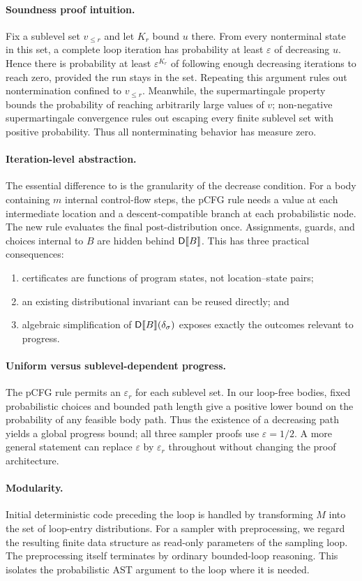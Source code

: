 \paragraph{Soundness proof intuition.}
Fix a sublevel set $v_{\le r}$ and let $K_r$ bound $u$ there. From every nonterminal state in this set, a complete loop iteration has probability at least $\varepsilon$ of decreasing $u$. Hence there is probability at least $\varepsilon^{K_r}$ of following enough decreasing iterations to reach zero, provided the run stays in the set. Repeating this argument rules out nontermination confined to $v_{\le r}$. Meanwhile, the supermartingale property bounds the probability of reaching arbitrarily large values of $v$; non-negative supermartingale convergence rules out escaping every finite sublevel set with positive probability. Thus all nonterminating behavior has measure zero.

\paragraph{Iteration-level abstraction.}
The essential difference to  is the granularity of the decrease condition. For a body containing $m$ internal control-flow steps, the pCFG rule needs a value at each intermediate location and a descent-compatible branch at each probabilistic node. The new rule evaluates the final post-distribution once. Assignments, guards, and choices internal to $B$ are hidden behind $\mathsf{D}\llbracket B\rrbracket$. This has three practical consequences:
\begin{enumerate}
 \item certificates are functions of program states, not location--state pairs;
 \item an existing distributional invariant can be reused directly; and
 \item algebraic simplification of $\mathsf{D}\llbracket B\rrbracket(\delta_{\sigma})$ exposes exactly the outcomes relevant to progress.
\end{enumerate}

\paragraph{Uniform versus sublevel-dependent progress.}
The pCFG rule permits an $\varepsilon_r$ for each sublevel set. In our loop-free bodies, fixed probabilistic choices and bounded path length give a positive lower bound on the probability of any feasible body path. Thus the existence of a decreasing path yields a global progress bound; all three sampler proofs use $\varepsilon=1/2$. A more general statement can replace $\varepsilon$ by $\varepsilon_r$ throughout without changing the proof architecture.

\paragraph{Modularity.}
Initial deterministic code preceding the loop is handled by transforming $M$ into the set of loop-entry distributions. For a sampler with preprocessing, we regard the resulting finite data structure as read-only parameters of the sampling loop. The preprocessing itself terminates by ordinary bounded-loop reasoning. This isolates the probabilistic AST argument to the loop where it is needed.
